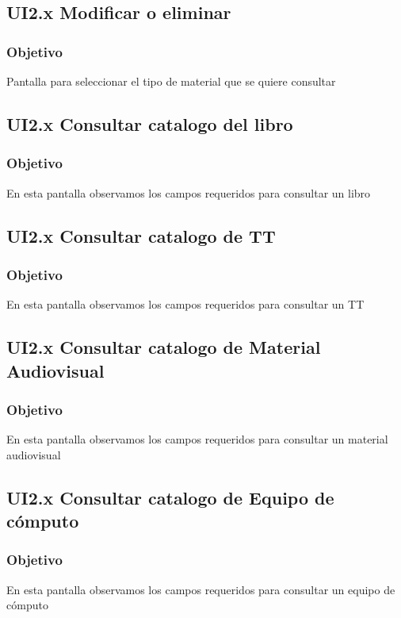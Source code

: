 \newpage
\subsection{UI2.x Modificar o eliminar}

\subsubsection{Objetivo}
	Pantalla para seleccionar el tipo de material que se quiere consultar



\newpage
\subsection{UI2.x Consultar catalogo del libro}

\subsubsection{Objetivo}
	En esta pantalla observamos los campos requeridos para consultar un libro



\newpage
\subsection{UI2.x Consultar catalogo de TT}

\subsubsection{Objetivo}
	En esta pantalla observamos los campos requeridos para consultar un TT


\newpage
\subsection{UI2.x Consultar catalogo de Material Audiovisual}

\subsubsection{Objetivo}
	En esta pantalla observamos los campos requeridos para consultar un material audiovisual


\newpage
\subsection{UI2.x Consultar catalogo de Equipo de cómputo}

\subsubsection{Objetivo}
	En esta pantalla observamos los campos requeridos para consultar un equipo de cómputo

